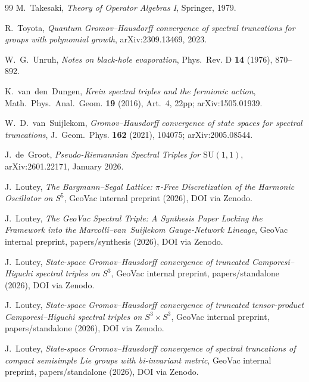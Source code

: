 \documentclass[11pt,a4paper]{article}
\theoremstyle{plain}
\theoremstyle{definition}
\newcommand{\sthree}{S^{3}}
\begin{document}
\begin{thebibliography}{99}
M.~Takesaki,
\newblock \emph{Theory of Operator Algebras I},
\newblock Springer, 1979.

R.~Toyota,
\newblock \emph{Quantum Gromov--Hausdorff convergence of spectral
truncations for groups with polynomial growth},
\newblock arXiv:2309.13469, 2023.

W.~G.~Unruh,
\newblock \emph{Notes on black-hole evaporation},
\newblock Phys.~Rev. D \textbf{14} (1976), 870--892.

K.~van~den~Dungen,
\newblock \emph{Krein spectral triples and the fermionic action},
\newblock Math.~Phys.~Anal.~Geom. \textbf{19} (2016), Art.~4, 22pp;
\newblock arXiv:1505.01939.

W.~D.~van~Suijlekom,
\newblock \emph{Gromov--Hausdorff convergence of state spaces for
spectral truncations},
\newblock J.~Geom.~Phys. \textbf{162} (2021), 104075;
\newblock arXiv:2005.08544.

J.~de~Groot,
\newblock \emph{Pseudo-Riemannian Spectral Triples for $\mathrm{SU}(1,1)$},
\newblock arXiv:2601.22171, January 2026.

J.~Loutey,
\newblock \emph{The Bargmann--Segal Lattice: $\pi$-Free Discretization
of the Harmonic Oscillator on $S^5$},
\newblock GeoVac internal preprint (2026), DOI via Zenodo.

J.~Loutey,
\newblock \emph{The GeoVac Spectral Triple: A Synthesis Paper Locking
the Framework into the Marcolli--van~Suijlekom Gauge-Network Lineage},
\newblock GeoVac internal preprint, papers/synthesis (2026),
DOI via Zenodo.

J.~Loutey,
\newblock \emph{State-space Gromov--Hausdorff convergence of truncated
Camporesi--Higuchi spectral triples on $S^3$},
\newblock GeoVac internal preprint, papers/standalone (2026),
DOI via Zenodo.

J.~Loutey,
\newblock \emph{State-space Gromov--Hausdorff convergence of truncated
tensor-product Camporesi--Higuchi spectral triples on $\sthree \times \sthree$},
\newblock GeoVac internal preprint, papers/standalone (2026),
DOI via Zenodo.

J.~Loutey,
\newblock \emph{State-space Gromov--Hausdorff convergence of spectral
truncations of compact semisimple Lie groups with bi-invariant metric},
\newblock GeoVac internal preprint, papers/standalone (2026),
DOI via Zenodo.


\end{thebibliography}
\end{document}
